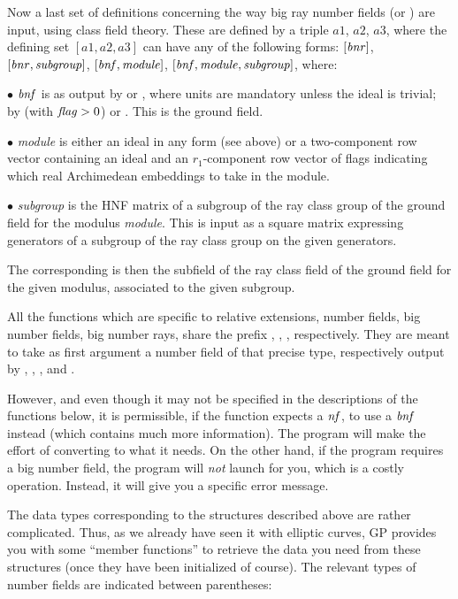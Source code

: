 Now a last set of definitions concerning the way big ray number fields
(or ) are input, using class field theory.
These are defined by a triple
$a1$, $a2$, $a3$, where the defining set $[a1,a2,a3]$ can have any of the
following forms: $[\hbox{\it bnr\/}]$, $[\hbox{\it bnr\/},\hbox{\it subgroup\/}]$,
$[\hbox{\it bnf\/},\hbox{\it module\/}]$, $[\hbox{\it bnf\/},\hbox{\it module\/},\hbox{\it subgroup\/}]$, where:

$\bullet$ $\hbox{\it bnf\/}$ is as output by  or ,
where units are mandatory unless the ideal is trivial;  by
 (with $\hbox{\it f\kern0pt lag\/}>0$) or . This is the ground field.

$\bullet$ \emph{module} is either an ideal in any form (see above) or a
two-component row vector containing an ideal and an $r_1$-component row
vector of flags indicating which real Archimedean embeddings to take in the
module.

$\bullet$ \emph{subgroup} is the HNF matrix of a subgroup of the ray class group
of the ground field for the modulus \emph{module}. This is input as a square
matrix expressing generators of a subgroup of the ray class group
 on the given generators.

The corresponding  is then the subfield of the ray class field of the
ground field for the given modulus, associated to the given subgroup.

All the functions which are specific to relative extensions, number fields,
big number fields, big number rays, share the prefix , ,
,  respectively. They are meant to take as first argument a
number field of that precise type, respectively output by ,
, , and .

However, and even though it may not be specified in the descriptions of the
functions below, it is permissible, if the function expects a $\hbox{\it nf\/}$, to
use a $\hbox{\it bnf\/}$ instead (which contains much more information). The program
will make the effort of converting to what it needs. On the other hand, if
the program requires a big number field, the program will \emph{not} launch
 for you, which is a costly operation. Instead, it will give you
a specific error message.

The data types corresponding to the structures described above are rather
complicated. Thus, as we already have seen it with elliptic curves, GP
provides you with some ``member functions'' to retrieve the data you need
from these structures (once they have been initialized of course). The
relevant types of number fields are indicated between parentheses:
\smallskip

